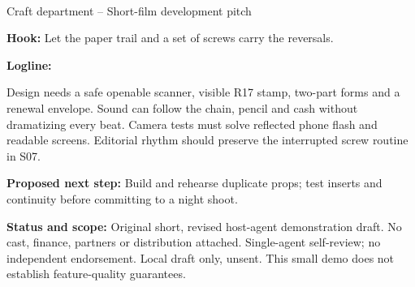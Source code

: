 \documentclass[11pt,letterpaper]{article}
\begin{document}
\begin{center}
{\Large\bfseries\sffamily \filmtitleupper}\\[6pt]
Craft department -- Short-film development pitch
\end{center}
\textbf{Hook:} Let the paper trail and a set of screws carry the reversals.

\textbf{Logline:} \filmlogline

Design needs a safe openable scanner, visible R17 stamp, two-part forms and a renewal envelope. Sound can follow the chain, pencil and cash without dramatizing every beat. Camera tests must solve reflected phone flash and readable screens. Editorial rhythm should preserve the interrupted screw routine in S07.

\textbf{Proposed next step:} Build and rehearse duplicate props; test inserts and continuity before committing to a night shoot.

\textbf{Status and scope:} Original short, revised host-agent demonstration draft. No cast, finance, partners or distribution attached. Single-agent self-review; no independent endorsement. Local draft only, unsent. This small demo does not establish feature-quality guarantees.
\end{document}
